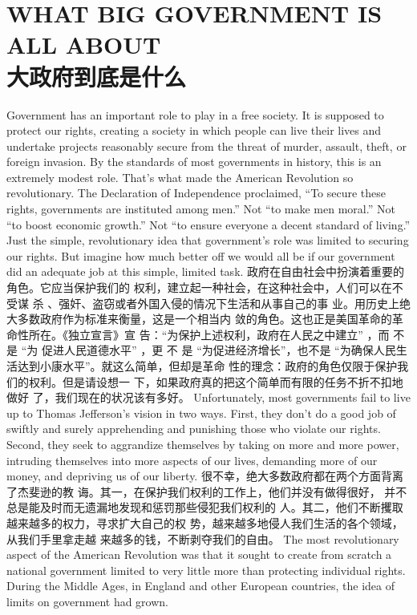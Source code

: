 \chapter{WHAT BIG GOVERNMENT IS ALL ABOUT\\大政府到底是什么}
\begin{paracol}{2}

Government has an important role to play in a free society. It is supposed to protect our rights, creating a society in which people can live their lives and undertake projects
reasonably secure from the threat of murder, assault, theft, or
foreign invasion. By the standards of most governments in history, this is an extremely modest role. That's what made the
American Revolution so revolutionary. The Declaration of Independence proclaimed, ``To secure these rights, governments
are instituted among men.'' Not ``to make men moral.'' Not ``to
boost economic growth.'' Not ``to ensure everyone a decent
standard of living.'' Just the simple, revolutionary idea that
government's role was limited to securing our rights. But
imagine how much better off we would all be if our government did an adequate job at this simple, limited task.
\switchcolumn
政府在自由社会中扮演着重要的角色。它应当保护我们的
权利，建立起一种社会，在这种社会中，人们可以在不受谋
杀 、强奸、盗窃或者外国入侵的情况下生活和从事自己的事
业。用历史上绝大多数政府作为标准来衡量，这是一个相当内
敛的角色。这也正是美国革命的革命性所在。《独立宣言》宣
告：“为保护上述权利，政府在人民之中建立” ，而 不 是 “为
促进人民道德水平” ，更 不 是 “为促进经济增长”，也不是
“为确保人民生活达到小康水平”。就这么简单，但却是革命
性的理念：政府的角色仅限于保护我们的权利。但是请设想一
下，如果政府真的把这个简单而有限的任务不折不扣地做好
了，我们现在的状况该有多好。
\switchcolumn*
Unfortunately, most governments fail to live up to Thomas
Jefferson's vision in two ways. First, they don't do a good job of
swiftly and surely apprehending and punishing those who violate our rights. Second, they seek to aggrandize themselves by
taking on more and more power, intruding themselves into
more aspects of our lives, demanding more of our money, and
depriving us of our liberty.
\switchcolumn
很不幸，绝大多数政府都在两个方面背离了杰斐逊的教
诲。其一，在保护我们权利的工作上，他们并没有做得很好，
并不总是能及时而无遗漏地发现和惩罚那些侵犯我们权利的
人。其二，他们不断攫取越来越多的权力，寻求扩大自己的权
势，越来越多地侵人我们生活的各个领域，从我们手里拿走越
来越多的钱，不断剥夺我们的自由。
\switchcolumn*
The most revolutionary aspect of the American Revolution
was that it sought to create from scratch a national government limited to very little more than protecting individual rights. During the Middle Ages, in England and other European countries, the idea of limits on government had grown.

\end{paracol}
